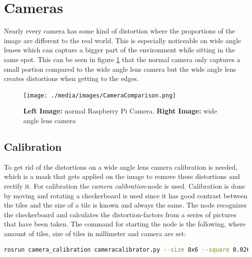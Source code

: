 \section{Cameras\authorA}
Nearly every camera has some kind of distortion where the proportions of the image are different to the real world. This is especially noticeable on wide angle lenses which can capture a bigger part of the environment while sitting in the same spot. This can be seen in figure \ref{cameracomparison} that the normal camera only captures a small portion compared to the wide angle lens camera but the wide angle lens creates distortions when getting to the edges.\newline
\begin{figure}[h]
	\centering
	\texttt{[image: ./media/images/CameraComparison.png]}
  	\caption{\textbf{Left Image:} normal Raspberry Pi Camera. \textbf{Right Image:} wide angle lens camera}
  	\label{cameracomparison}
\end{figure}

\subsection{Calibration}
To get rid of the distortions on a wide angle lens camera calibration is needed, which is a mask that gets applied on the image to remove these distortions and rectify it.
For calibration the \textit{camera calibration}-node is used.  Calibration is done by moving and rotating a checkerboard is used since it has good contrast between the tiles and the size of a tile is known and always the same. The node recognizes the checkerboard and calculates the distortion-factors from a series of pictures that have been taken.\newline
The command for starting the node is the following, where amount of tiles, size of tiles in millimeter and camera are set:\newline
\begin{lstlisting}[language=BASH,caption={Start Calibration Node}]
rosrun camera_calibration cameracalibrator.py --size 8x6 --square 0.026 --no-service-check image:=/camera/image_raw camera:=/camera
\end{lstlisting}

